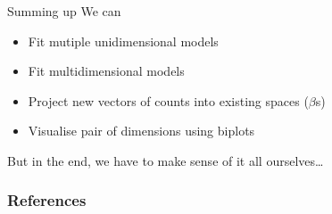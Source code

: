 \documentclass{hertieteaching}
\begin{document}
\begin{frame}{Summing up}
We can
\begin{itemize}
  \item Fit mutiple unidimensional models
  \item Fit multidimensional models
  \item Project new vectors of counts into existing spaces ($\beta$s) 
  \item Visualise pair of dimensions using biplots
\end{itemize}
But in the end, we have to make sense of it all ourselves\ldots

\end{frame}






%
%
%
%
%
%
%

%



\begin{frame}[allowframebreaks]
\frametitle{References}
\printbibliography	
\end{frame}
\end{document}
